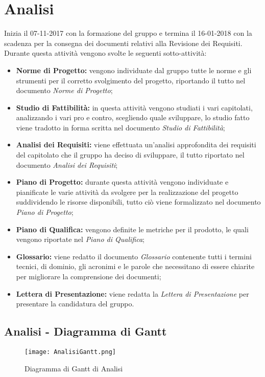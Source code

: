 \documentclass[./PianodiProgetto.tex]{subfiles}
\begin{document}
	\section{Analisi}
	Inizia il 07-11-2017 con la formazione del gruppo e termina il 16-01-2018 con la scadenza per la consegna dei documenti relativi alla Revisione dei Requisiti.
	Durante questa attività vengono svolte le seguenti sotto-attività:
	\begin{itemize}
		\item \textbf{Norme di Progetto:} vengono individuate dal gruppo tutte le norme e gli strumenti per il corretto svolgimento del progetto, riportando il tutto nel documento \textit{Norme di Progetto};
		\item \textbf{Studio di Fattibilità:} in questa attività vengono studiati i vari capitolati, analizzando i vari pro e contro, scegliendo quale sviluppare, lo studio fatto viene tradotto in forma scritta nel documento \textit{Studio di Fattibilità};
		\item \textbf{Analisi dei Requisiti:} viene effettuata un'analisi approfondita dei requisiti del capitolato che il gruppo ha deciso di sviluppare, il tutto riportato nel documento \textit{Analisi dei Requisiti};
		\item \textbf{Piano di Progetto:} durante questa attività vengono individuate e pianificate le varie attività da svolgere per la realizzazione del progetto suddividendo le risorse disponibili, tutto ciò viene formalizzato nel documento \textit{Piano di Progetto}; 
		\item \textbf{Piano di Qualifica:} vengono definite le metriche per il prodotto, le quali vengono riportate nel \textit{Piano di Qualifica};
		\item \textbf{Glossario:} viene redatto il documento \textit{Glossario}	contenente tutti i termini tecnici, di dominio, gli acronimi e le parole che necessitano di essere chiarite per migliorare la comprensione dei documenti;
		\item \textbf{Lettera di Presentazione:} viene redatta la \textit{Lettera di Presentazione} per presentare la candidatura del gruppo.	
	\end{itemize}
	
	\subsection{Analisi - Diagramma di Gantt}
	\begin{figure}[H]
		\texttt{[image: AnalisiGantt.png]}	
		\caption{Diagramma di Gantt di Analisi}\label{fig:1}	
	\end{figure}
	\newpage
\end{document}
